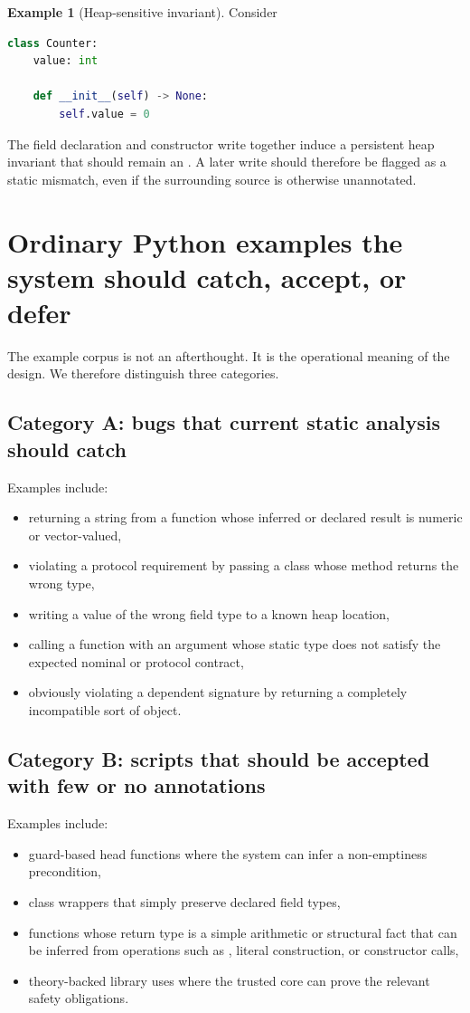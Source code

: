 \documentclass[11pt]{article}
\newcommand{\py}[1]{\texttt{\detokenize{#1}}}
\theoremstyle{definition}
\newtheorem{example}[definition]{Example}
\theoremstyle{plain}
\begin{document}
\begin{example}[Heap-sensitive invariant]
Consider
\begin{lstlisting}[style=deppy,language=Python]
class Counter:
    value: int

    def __init__(self) -> None:
        self.value = 0
\end{lstlisting}
The field declaration and constructor write together induce a persistent heap
invariant that \py{self.value} should remain an \py{int}. A later write
\py{self.value = "zero"} should therefore be flagged as a static mismatch, even
if the surrounding source is otherwise unannotated.
\end{example}



\section{Ordinary Python examples the system should catch, accept, or defer}

The example corpus is not an afterthought. It is the operational meaning of the
design. We therefore distinguish three categories.

\subsection{Category A: bugs that current static analysis should catch}
Examples include:
\begin{itemize}
  \item returning a string from a function whose inferred or declared result is
  numeric or vector-valued,
  \item violating a protocol requirement by passing a class whose method returns
  the wrong type,
  \item writing a value of the wrong field type to a known heap location,
  \item calling a function with an argument whose static type does not satisfy the
  expected nominal or protocol contract,
  \item obviously violating a dependent signature by returning a completely
  incompatible sort of object.
\end{itemize}

\subsection{Category B: scripts that should be accepted with few or no annotations}
Examples include:
\begin{itemize}
  \item guard-based head functions where the system can infer a non-emptiness
  precondition,
  \item class wrappers that simply preserve declared field types,
  \item functions whose return type is a simple arithmetic or structural fact that
  can be inferred from operations such as \py{len}, literal construction, or
  constructor calls,
  \item theory-backed library uses where the trusted core can prove the relevant
  safety obligations.
\end{itemize}
\end{document}

